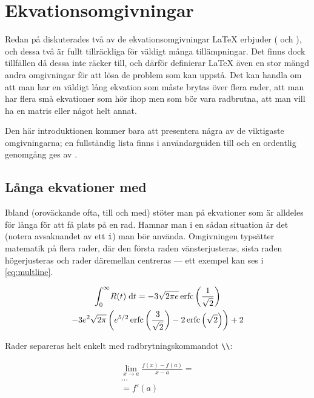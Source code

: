 \documentclass[10pt,../../a4.tex]{subfiles}
\begin{document}
\section{Ekvationsomgivningar}\label{sec:3:environments}
Redan på  diskuterades två av de 
ekvationsomgivningar
\AmS\LaTeX{} erbjuder ( och ), och dessa två
är fullt tillräckliga för väldigt många tillämpningar. Det finns dock
tillfällen då dessa inte räcker till, och därför definierar \AmS\LaTeX{}
även en stor mängd andra omgivningar för att lösa de problem som kan 
uppstå. Det kan handla om att man har en väldigt lång ekvation som måste
brytas över flera rader, att man har flera små ekvationer som hör ihop men
som bör vara radbrutna, att man vill ha en matris eller något helt annat.

Den här introduktionen kommer bara att presentera några av de viktigaste
omgivningarna; en fullständig lista finns i användarguiden till
 \parencite{AMS99} och en ordentlig genomgång ges av
\textcite{Voss10}.

\subsection{Långa ekvationer med }
Ibland (oroväckande ofta, till och med) stöter man på ekvationer som är
alldeles för långa för att få plats på en rad. Hamnar man i en sådan
situation är det  (notera avsaknandet av ett \texttt{i})
man bör använda. Omgivningen typsätter matematik på flera rader, där den
första raden vänsterjusteras, sista raden högerjusteras och rader 
däremellan centreras — ett exempel kan ses i \cref{eq:multline}.

\begin{multline}\label{eq:multline}
	\int_0^\infty\!R(t)\d{t} = -3\sqrt{2\pi 
	e}\erfc\left(\frac{1}{\sqrt{2}}\right) \\
	-3e^2\sqrt{2\pi}\left(e^{5/2}\erfc\left(
	\frac{3}{\sqrt{2}}\right) - 2\erfc\left(
	\sqrt{2}\right)\right) + 2
\end{multline}

Rader separeras helt enkelt med radbrytningskommandot \verb|\\|:
\begin{latexcode}
\begin{multline}
\lim_{x\to a} \frac{f(x) - f(a)}{x - a} = \\
\ldots \\
= f'(a)
\end{multline}
\end{latexcode}
\end{document}
